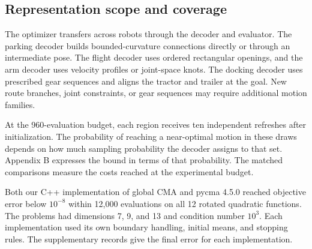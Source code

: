\subsection{Representation scope and coverage}

The optimizer transfers across robots through the decoder and evaluator. The parking decoder builds bounded-curvature connections directly or through an intermediate pose. The flight decoder uses ordered rectangular openings, and the arm decoder uses velocity profiles or joint-space knots. The docking decoder uses prescribed gear sequences and aligns the tractor and trailer at the goal. New route branches, joint constraints, or gear sequences may require additional motion families.

At the 960-evaluation budget, each region receives ten independent refreshes after initialization. The probability of reaching a near-optimal motion in these draws depends on how much sampling probability the decoder assigns to that set. Appendix B expresses the bound in terms of that probability. The matched comparisons measure the costs reached at the experimental budget.


Both our C++ implementation of global CMA and pycma 4.5.0 reached objective error below $10^{-8}$ within 12,000 evaluations on all 12 rotated quadratic functions. The problems had dimensions 7, 9, and 13 and condition number $10^3$. Each implementation used its own boundary handling, initial means, and stopping rules. The supplementary records give the final error for each implementation.
